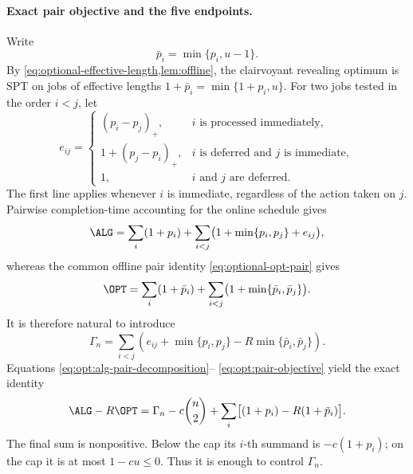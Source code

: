 \paragraph{Exact pair objective and the five endpoints.}
Write
\[
 \bar p_i=\min\{p_i,u-1\}.
\]
By \cref{eq:optional-effective-length,lem:offline}, the clairvoyant revealing
optimum is SPT on jobs of effective lengths
$1+\bar p_i=\min\{1+p_i,u\}$.  For two jobs tested in the order $i<j$, let
\begin{equation}
 e_{ij}=
 \begin{cases}
  (p_i-p_j)_+,
     &i\text{ is processed immediately},\\
  1+(p_j-p_i)_+,
     &i\text{ is deferred and }j\text{ is immediate},\\
  1,
     &i\text{ and }j\text{ are deferred}.
 \end{cases}
 \label{eq:opt:pair-excess}
\end{equation}
The first line applies whenever $i$ is immediate, regardless of the
action taken on $j$.  Pairwise completion-time accounting for the online
schedule gives
\begin{equation}
 \ALG
 =\sum_i(1+p_i)
   +\sum_{i<j}\bigl(1+\min\{p_i,p_j\}+e_{ij}\bigr),
 \label{eq:opt:alg-pair-decomposition}
\end{equation}
whereas the common offline pair identity \cref{eq:optional-opt-pair} gives
\begin{equation}
 \OPT
 =\sum_i(1+\bar p_i)
   +\sum_{i<j}\bigl(1+\min\{\bar p_i,\bar p_j\}\bigr).
 \label{eq:opt:opt-pair-decomposition}
\end{equation}
It is therefore natural to introduce
\begin{equation}
 \Gamma_n=\sum_{i<j}
 \left(e_{ij}+\min\{p_i,p_j\}
       -R\min\{\bar p_i,\bar p_j\}\right).
 \label{eq:opt:pair-objective}
\end{equation}
Equations \eqref{eq:opt:alg-pair-decomposition}--
\eqref{eq:opt:pair-objective} yield the exact identity
\begin{equation}
 \ALG-R\OPT
 =\Gamma_n-c\binom n2
  +\sum_i\bigl[(1+p_i)-R(1+\bar p_i)\bigr].
 \label{eq:opt:gap-decomposition}
\end{equation}
The final sum is nonpositive.  Below the cap its $i$-th summand is
$-c(1+p_i)$; on the cap it is at most $1-cu\le0$.  Thus it is enough
to control $\Gamma_n$.

